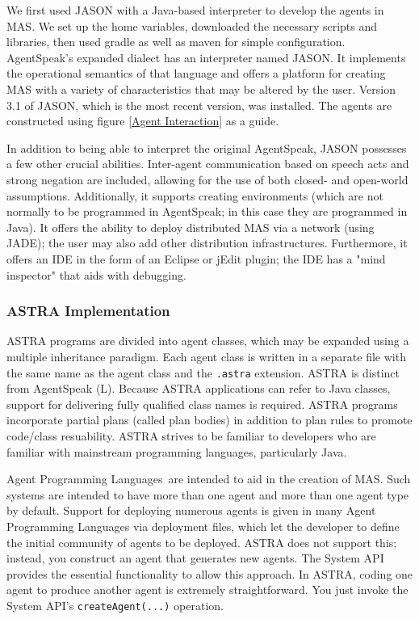 We first used JASON with a Java-based interpreter to develop the agents in \ac{MAS}. We set up the home variables, downloaded the necessary scripts and libraries, then used gradle as well as maven for simple configuration. AgentSpeak's expanded dialect has an interpreter named JASON. It implements the operational semantics of that language and offers a platform for creating \ac{MAS} with a variety of characteristics that may be altered by the user. Version 3.1 of JASON, which is the most recent version, was installed. The agents are constructed using figure  \ref{Agent Interaction} as a guide.

\vspace{.5cm}

In addition to being able to interpret the original AgentSpeak, JASON possesses a few other crucial abilities. Inter-agent communication based on speech acts and strong negation are included, allowing for the use of both closed- and open-world assumptions. Additionally, it supports creating environments (which are not normally to be programmed in AgentSpeak; in this case they are programmed in Java). It offers the ability to deploy distributed \ac{MAS} via a network (using \ac{JADE}); the user may also add other distribution infrastructures. Furthermore, it offers an \ac{IDE} in the form of an Eclipse or jEdit plugin; the \ac{IDE} has a "mind inspector" that aids with debugging.

\subsubsection{ASTRA Implementation}

\ac{ASTRA} programs are divided into agent classes, which may be expanded using a multiple inheritance paradigm. Each agent class is written in a separate file with the same name as the agent class and the \texttt{.astra} extension. \ac{ASTRA} is distinct from AgentSpeak (L). Because \ac{ASTRA} applications can refer to Java classes, support for delivering fully qualified class names is required. \ac{ASTRA} programs incorporate partial plans (called plan bodies) in addition to plan rules to promote code/class resuability. \ac{ASTRA} strives to be familiar to developers who are familiar with mainstream programming languages, particularly Java.

 \vspace{.5cm}
 
Agent Programming Languages are intended to aid in the creation of \ac{MAS}. Such systems are intended to have more than one agent and more than one agent type by default. Support for deploying numerous agents is given in many Agent Programming Languages via deployment files, which let the developer to define the initial community of agents to be deployed. \ac{ASTRA} does not support this; instead, you construct an agent that generates new agents. The System \ac{API} provides the essential functionality to allow this approach. In \ac{ASTRA}, coding one agent to produce another agent is extremely straightforward. You just invoke the System \ac{API}'s \texttt{createAgent(...)} operation.

